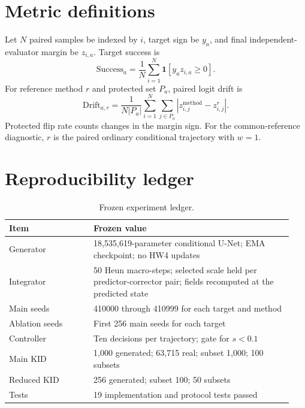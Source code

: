 \documentclass[10pt,twocolumn,letterpaper]{article}
\begin{document}
\section{Metric definitions}

Let $N$ paired samples be indexed by $i$, target sign be $y_a$, and final
independent-evaluator margin be $z_{i,a}$. Target success is
\begin{equation}
    \mathrm{Success}_a=\frac{1}{N}\sum_{i=1}^{N}
    \mathbf{1}\!\left[y_a z_{i,a}\geq0\right].
\end{equation}
For reference method $r$ and protected set $P_a$, paired logit drift is
\begin{equation}
    \mathrm{Drift}_{a,r}=\frac{1}{N|P_a|}
    \sum_{i=1}^{N}\sum_{j\in P_a}
    \left|z_{i,j}^{\mathrm{method}}-z_{i,j}^{r}\right|.
\end{equation}
Protected flip rate counts changes in the margin sign. For the common-reference
diagnostic, $r$ is the paired ordinary conditional trajectory with $w=1$.

\section{Reproducibility ledger}

\begin{table}[ht]
\caption{Frozen experiment ledger.}
\centering
\footnotesize
\begin{tabular}{@{}p{0.28\linewidth}p{0.66\linewidth}@{}}
\toprule
Item & Frozen value \\
\midrule
Generator & 18,535,619-parameter conditional U-Net; EMA checkpoint; no HW4
updates \\
Integrator & 50 Heun macro-steps; selected scale held per predictor-corrector
pair; fields recomputed at the predicted state \\
Main seeds & 410000 through 410999 for each target and method \\
Ablation seeds & First 256 main seeds for each target \\
Controller & Ten decisions per trajectory; gate for $s<0.1$ \\
Main KID & 1,000 generated; 63,715 real; subset 1,000; 100 subsets \\
Reduced KID & 256 generated; subset 100; 50 subsets \\
Tests & 19 implementation and protocol tests passed \\
\bottomrule
\end{tabular}
\end{table}
\end{document}
